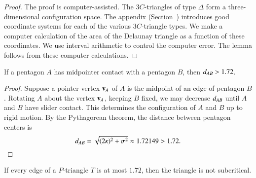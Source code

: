 \begin{proof} The proof is computer-assisted.  The $3C$-triangles of
  type $\Delta$ form a three-dimensional configuration space.  The
  appendix (Section~) introduces good coordinate
  systems for each of the various $3C$-triangle types.  We make a
  computer calculation of the area of the Delaunay triangle as a
  function of these coordinates.  We use interval arithmetic to
  control the computer error.  The lemma follows from these computer
  calculations.
\end{proof}



\begin{lemma}  
  If a pentagon $A$ has midpointer contact with a pentagon $B$, then
  $d_{AB} > 1.72$.
\end{lemma}

\begin{proof} Suppose a pointer vertex ${\mathbf v}_A$ of $A$ is the midpoint of an
  edge of pentagon $B$.  Rotating $A$ about the vertex ${\mathbf v}_A$, keeping
  $B$ fixed, we may decrease $d_{AB}$ until $A$ and $B$
  have slider contact.  This determines the configuration of $A$ and
  $B$ up to rigid motion.  By the Pythagorean theorem, the
  distance between pentagon centers is
\[
d_{AB} = \sqrt{(2\kappa)^2 + \sigma^2} \approx 1.72149 > 1.72.
\] %
\end{proof}

\begin{lemma}
  If every edge of a $P$-triangle $T$ is at most $1.72$, then the
  triangle is not subcritical.
\end{lemma}

